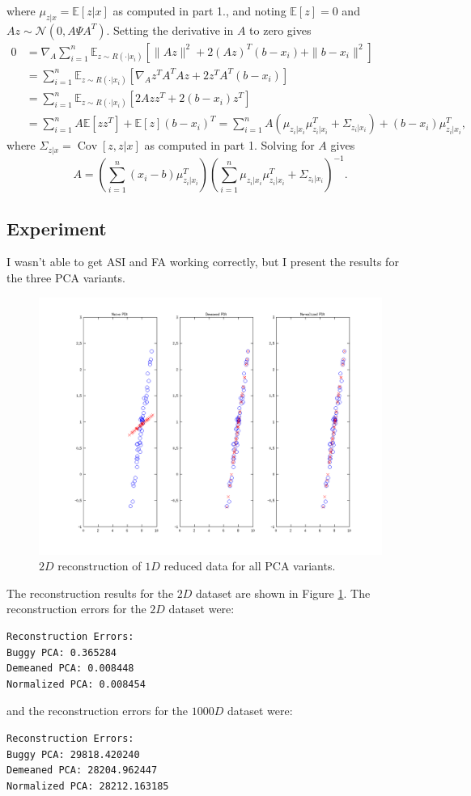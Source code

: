 \documentclass[11pt]{article}
\newcommand{\inv}{^{-1}}
\newcommand{\E}{\mathbb{E}} %
\newcommand{\Cov}{\operatorname{Cov}} %
\begin{document}
\begin{enumerate}
where $\mu_{z|x} = \E[z | x]$ as computed in part 1., and noting $\E[z] = 0$
and $Az \sim \mathcal{N}(0,A \Psi A^T)$. Setting the derivative in $A$ to zero
gives
\begin{align*}
0
 &  = \nabla_A \sum_{i = 1}^n \E_{z \sim R( \cdot | x_i)}
        \left[ \|Az\|^2 + 2(Az)^T(b - x_i) + \|b - x_i\|^2 \right]  \\
 &  = \sum_{i = 1}^n \E_{z \sim R( \cdot | x_i)}
        \left[ \nabla_A z^TA^TAz + 2z^TA^T(b - x_i) \right] \\
 &  = \sum_{i = 1}^n \E_{z \sim R( \cdot | x_i)}
        \left[ 2Azz^T + 2(b - x_i)z^T \right]    \\
 &  = \sum_{i = 1}^n A\E[zz^T] + \E[z](b - x_i)^T
    = \sum_{i = 1}^n A(\mu_{z_i|x_i}\mu_{z_i|x_i}^T + \Sigma_{z_i|x_i})
        + (b - x_i)\mu_{z_i|x_i}^T,
\end{align*}
where $\Sigma_{z|x} = \Cov[z,z | x]$ as computed in part 1. Solving for $A$
gives
\[A = \left( \sum_{i = 1}^n (x_i - b)\mu_{z_i|x_i}^T \right)
        \left( \sum_{i = 1}^n \mu_{z_i|x_i}\mu_{z_i|x_i}^T + \Sigma_{z_i|x_i} \right) \inv.
\]
\end{enumerate}

\subsection{Experiment}
I wasn't able to get ASI and FA working correctly, but I present the results
for the three PCA variants.

\begin{figure}[h!]
\centering
\quad\;
\includegraphics[trim=22mm 0mm 15mm 0mm, clip=true, width=0.6\linewidth]{14results}
\vspace{-12mm}
\caption{$2D$ reconstruction of $1D$ reduced data for all PCA variants.}
\label{fig:14results}
\end{figure}

The reconstruction results for the $2D$ dataset are shown in Figure
\ref{fig:14results}.
The reconstruction errors for the $2D$ dataset were:
\begin{verbatim}
Reconstruction Errors:
Buggy PCA: 0.365284
Demeaned PCA: 0.008448
Normalized PCA: 0.008454
\end{verbatim}
and the reconstruction errors for the $1000D$ dataset were:
\begin{verbatim}
Reconstruction Errors:
Buggy PCA: 29818.420240
Demeaned PCA: 28204.962447
Normalized PCA: 28212.163185
\end{verbatim}
\end{document}
